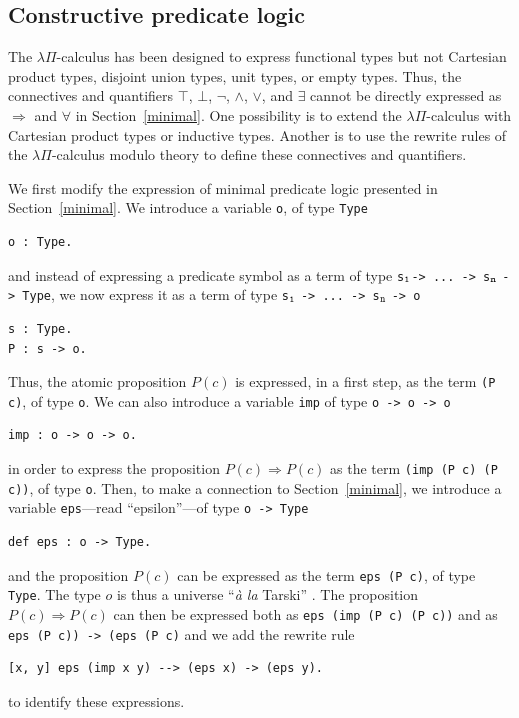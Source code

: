 \documentclass[english]{lipics}
\newcommand\fa{\forall}
\newcommand\ex{\exists}
\newcommand\lst[1]{{\rm \lstinline{#1}}}
\begin{document}
\subsection{Constructive predicate logic}
\label{constructive}

The $\lambda \Pi$-calculus has been designed to express functional
types but not Cartesian product types, disjoint union types, unit
types, or empty types. Thus, the connectives and quantifiers $\top$,
$\bot$, $\neg$, $\wedge$, $\vee$, and $\ex$ cannot be directly
expressed as $\Rightarrow$ and $\fa$ in Section~\ref{minimal}. One
possibility is to extend the $\lambda
\Pi$-calculus with Cartesian product types or inductive types. Another
is to use the rewrite rules of the $\lambda \Pi$-calculus modulo
theory to define these connectives and quantifiers.

We first modify the expression of minimal predicate logic presented in
Section~\ref{minimal}. We introduce a variable \lst{o}, of type
\lst{Type}
\begin{lstlisting}
o : Type.
\end{lstlisting}
and instead of expressing a predicate symbol as a term of type
\lst{s}$_{\tt 1} $\lst{-> ... -> s}$_{\tt n}$ \lst{-> Type},
we now express it as a term of type
\lst{s}$_{\tt 1}$ \lst{-> ... -> s}$_{\tt n}$ \lst{-> o}

\begin{lstlisting}
s : Type.
P : s -> o.
\end{lstlisting}
Thus, the atomic proposition $P(c)$ is expressed, in a first
step, as the term \lst{(P c)}, of type \lst{o}. We can also introduce a
variable \lst{imp} of type \lst{o -> o -> o}
\begin{lstlisting}
imp : o -> o -> o.
\end{lstlisting}
in order to express the
proposition $P(c) \Rightarrow P(c)$ as the term \lst{(imp (P c) (P c))},
of type \lst{o}.
Then, to make a connection to Section~\ref{minimal}, we introduce a variable
\lst{eps}---read ``epsilon''---of type \lst{o -> Type}
\begin{lstlisting}
def eps : o -> Type.
\end{lstlisting}
and the proposition $P(c)$ can be
expressed as the term \lst{eps (P c)}, of type \lst{Type}. The type
$o$ is thus a universe ``{\em à la} Tarski'' \cite{MartinLof}.
The
proposition $P(c) \Rightarrow P(c)$ can then be expressed both as
\lst{eps (imp (P c) (P c))}
and as
\lst{eps (P c)) -> (eps (P c)} and we add
the rewrite rule
\begin{lstlisting}
[x, y] eps (imp x y) --> (eps x) -> (eps y).
\end{lstlisting}
to identify these expressions.
\end{document}
